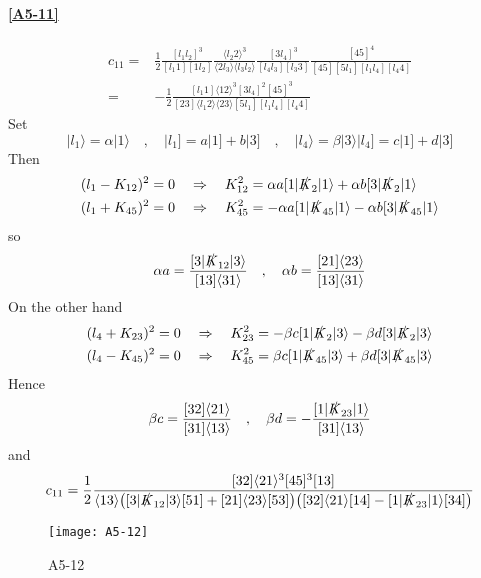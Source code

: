 \paragraph{\ref{A5-11}}
\begin{equation*}
\begin{split}
c_{11} = &
\frac{1}{2}\frac{[l_1 l_2]^3}{[l_1 1][1l_2]}
\frac{\langle l_2 2 \rangle^3}{\langle 2 l_3 \rangle\langle l_3 l_2 \rangle}
\frac{[3l_4]^3}{[l_4 l_3][l_3 3]}
\frac{[45]^4}{[45][5l_1][l_1l_4][l_4 4]}
\\
= &
-\frac{1}{2}
\frac{[l_1 1]\langle 12 \rangle^3[3l_4]^2[45]^3}{[23]\langle l_1 2 \rangle\langle 23 \rangle[5l_1][l_1l_4][l_4 4]}
\end{split}
\end{equation*}
%
Set
\begin{equation*}
|l_1\rangle = \alpha| 1\rangle \quad,\quad
|l_1] = a|1] + b|3] \quad,\quad
|l_4\rangle = \beta|3\rangle 
| l_4] = c|1] + d|3]
\end{equation*}
Then
\begin{equation*}
\begin{split}
& (l_1- K_{12})^2 = 0 \quad\Rightarrow\quad K_{12}^2 = \alpha a [1|\slashed{K}_2|1\rangle + \alpha b [3|\slashed{K}_2|1\rangle
\\
& (l_1 + K_{45})^2 = 0 \quad\Rightarrow\quad
K_{45}^2 = -\alpha a [1|\slashed{K}_{45}|1\rangle - \alpha b [3|\slashed{K}_{45}|1\rangle
\end{split}
\end{equation*}
so
\begin{equation*}
\alpha a = \frac{[3|\slashed{K}_{12}|3\rangle}{[13]\langle 31\rangle}
\quad,\quad
\alpha b = \frac{[21]\langle 23\rangle}{[13]\langle 31\rangle}
\end{equation*}
On the other hand
\begin{equation*}
\begin{split}
& (l_4 + K_{23})^2 = 0 \quad\Rightarrow\quad K_{23}^2 = -\beta c[1|\slashed{K}_2|3\rangle - \beta d [3|\slashed{K}_2|3\rangle
\\
& (l_4 - K_{45})^2 = 0 \quad\Rightarrow\quad K_{45}^2 = \beta c [1|\slashed{K}_{45}|3\rangle + \beta d [3|\slashed{K}_{45}|3\rangle
\end{split}
\end{equation*}
Hence
\begin{equation*}
\beta c = \frac{[32]\langle 21\rangle}{[31]\langle 13\rangle}
\quad,\quad
\beta d = -\frac{[1|\slashed{K}_{23}|1\rangle}{[31]\langle 13\rangle}
\end{equation*}
and
\begin{equation*}
c_{11} = \frac{1}{2}\frac{[32]\langle 21\rangle^3[45]^3[13]}{
\langle 13\rangle
\big( [3|\slashed{K}_{12}|3\rangle [51] + [21]\langle 23\rangle [53]\big)
\big( [32]\langle 21\rangle[14] - [1|\slashed{K}_{23}|1\rangle[34]\big)
}
\end{equation*}
%
\iffalse %
%
%
\begin{figure}
  \centering
    \texttt{[image: A5-12]}
    \caption{A5-12}
  \label{A5-12}
\end{figure}
